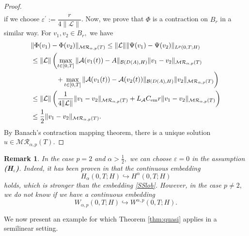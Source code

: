\documentclass[reqno]{amsart}
\newtheorem{rmk}{Remark}
\numberwithin{equation}{section}
\begin{document}
\begin{proof}
\begin{align*}
\end{align*}
if we choose $\varepsilon^\prime:=\dfrac{r}{4\|\mathcal{L}\|}$. Now, we prove that $\Phi$ is a contraction on $B_r$ in a similar way. For $v_1, v_2\in B_r,$ we have
\begin{align*}
&\|\Phi(v_1)-\Phi(v_2)\|_{\mathcal{M}\mathcal{R}_{\alpha,p}(T)} \le \|\mathcal{L}\| \|\Psi(v_1)-\Psi(v_2)\|_{L^p(0,T;H)}\\
&\le \|\mathcal{L}\| \left(\max_{t\in [0,T]} \|\mathcal{A}(v_1(t))-A\|_{\mathcal{B}(D(A),H)} \|v_1-v_2\|_{\mathcal{M}\mathcal{R}_{\alpha,p}(T)}\right.\\
& \hspace{1.3cm} \left. + \max_{t\in [0,T]} \|\mathcal{A}(v_1(t))-\mathcal{A}(v_2(t))\|_{\mathcal{B}(D(A),H)} \|v_2\|_{\mathcal{M}\mathcal{R}_{\alpha,p}(T)}\right)\\
& \le \|\mathcal{L}\| \left(\frac{1}{4\|\mathcal{L}\|} \|v_1-v_2\|_{\mathcal{M}\mathcal{R}_{\alpha,p}(T)} + L_\mathcal{A} C_{\mathrm{em}} r \|v_1-v_2\|_{\mathcal{M}\mathcal{R}_{\alpha,p}(T)}\right)\\
& \le\frac{1}{2} \|v_1-v_2\|_{\mathcal{M}\mathcal{R}_{\alpha,p}(T)}.
\end{align*}
By Banach's contraction mapping theorem, there is a unique solution $u\in \mathcal{M}\mathcal{R}_{\alpha,p}(T).$
\end{proof}

\begin{rmk}
In the case $p=2$ and $\alpha>\frac{1}{2},$ we can choose $\varepsilon=0$ in the assumption \textbf{(H$_\varepsilon$)}. Indeed, it has been proven in \cite[Theorem 2.4.1]{Ya25} that the continuous embedding
$$H_\alpha(0,T;H) \hookrightarrow H^\alpha(0,T;H)$$
holds, which is stronger than the embedding \eqref{SSlob}. However, in the case $p\neq 2,$ we do not
know if we have a continuous embedding
$$W_{\alpha,p}(0,T;H) \hookrightarrow W^{\alpha,p}(0,T;H).$$
\end{rmk}
\smallskip

We now present an example for which Theorem \ref{thm:quasi} applies in a semilinear setting.
\end{document}
